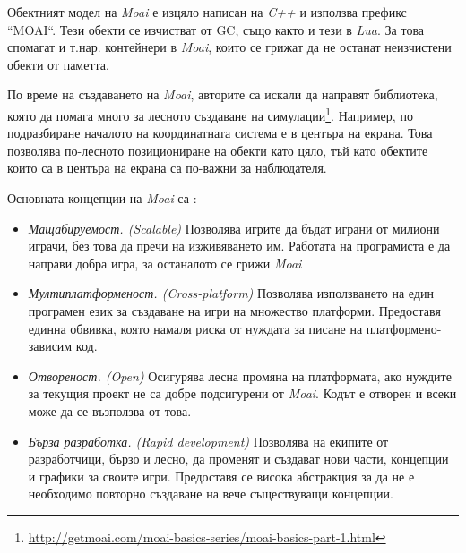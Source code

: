 		Обектният модел на \emph{Moai} е изцяло написан на \emph{C++} и използва префикс ``MOAI``. Тези обекти
		се изчистват от \ac{GC}, също както и тези в \emph{Lua}. За това спомагат и т.нар. контейнери в \emph{Moai},
		които се грижат да не останат неизчистени обекти от паметта.
		
		По време на създаването на \emph{Moai}, авторите са искали да направят библиотека, която да помага много
		за лесното създаване на симулации\footnote{\url{http://getmoai.com/moai-basics-series/moai-basics-part-1.html}}.
		Например, по подразбиране началото на координатната система е в центъра на екрана. Това позволява по-лесното
		позициониране на обекти като цяло, тъй като обектите които са в центъра на екрана са по-важни за наблюдателя.
		
		Основната концепции на \emph{Moai} са \cite{Zipline}:
		
		\begin{itemize}

			\item \emph{Мащабируемост. (Scalable)} Позволява игрите да бъдат играни от милиони играчи, без това
			да пречи на изживяването им. Работата на програмиста е да направи добра игра, за останалото се грижи
			\emph{Moai} 
			
			\item \emph{Мултиплатформеност. (Cross-platform)} Позволява използването на един програмен език за
			създаване на игри на множество платформи. Предоставя единна обвивка, която намаля риска от нуждата за
			писане на платформено-зависим код.
			
			\item \emph{Отвореност. (Open)} Осигурява лесна промяна на платформата, ако нуждите за текущия
			проект не са добре подсигурени от \emph{Moai}. Кодът е отворен и всеки може да се възползва от това.
			
			\item \emph{Бърза разработка. (Rapid development)} Позволява на екипите от разработчици, бързо и лесно, да
			променят и създават нови части, концепции и графики за своите игри. Предоставя се висока абстракция за да не е
			необходимо повторно създаване на вече съществуващи концепции.
			
		\end{itemize}			
